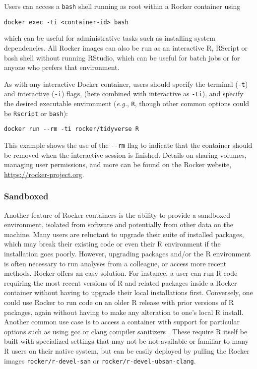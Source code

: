 Users can access a \texttt{bash} shell running as root within a Rocker
container using

\begin{verbatim}
docker exec -ti <container-id> bash
\end{verbatim}

\noindent which can be useful for administrative tasks such as
installing system dependencies. All Rocker images can also be run as an
interactive R, RScript or bash shell without running RStudio, which can
be useful for batch jobs or for anyone who prefers that environment.

As with any interactive Docker container, users should specify the
terminal (\texttt{-t}) and interactive (\texttt{-i}) flags, (here
combined with interactive as \texttt{-ti}), and specify the desired
executable environment (\emph{e.g.}, \texttt{R}, though other common
options could be \texttt{Rscript} or \texttt{bash}):

\begin{verbatim}
docker run --rm -ti rocker/tidyverse R
\end{verbatim}

This example shows the use of the \texttt{-\/-rm} flag to indicate that
the container should be removed when the interactive session is
finished. Details on sharing volumes, managing user permissions, and
more can be found on the Rocker website,
\url{https://rocker-project.org}.

\subsubsection{Sandboxed}\label{sandboxed}

Another feature of Rocker containers is the ability to provide a
sandboxed environment, isolated from software and potentially from other
data on the machine. Many users are reluctant to upgrade their suite of
installed packages, which may break their existing code or even their R
environment if the installation goes poorly. However, upgrading packages
and/or the R environment is often necessary to run analyses from a
colleague, or access more recent methods. Rocker offers an easy
solution. For instance, a user can run R code requiring the most recent
versions of R and related packages inside a Rocker container without
having to upgrade their local installations first. Conversely, one could
use Rocker to run code on an older R release with prior versions of R
packages, again without having to make any alteration to one's local R
install. Another common use case is to access a container with support
for particular options such as using gcc or clang compiler sanitizers
\citep{edd_sanitizers}. These require R itself be built with specialized
settings that may not be not available or familiar to many R users on
their native system, but can be easily deployed by pulling the Rocker
images \texttt{rocker/r-devel-san} or
\texttt{rocker/r-devel-ubsan-clang}.

